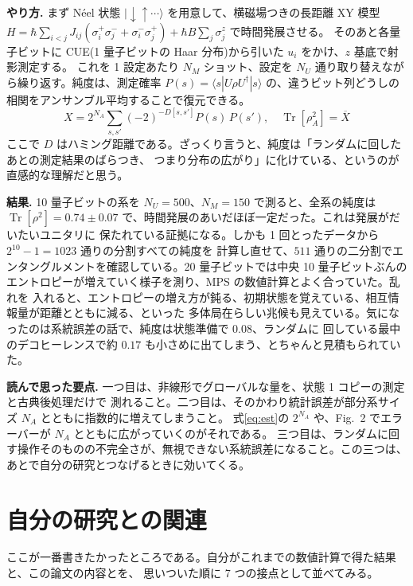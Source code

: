 \documentclass[10pt,a4paper,twocolumn]{ltjsarticle}
\newcommand{\ket}[1]{|#1\rangle}
\newcommand{\bra}[1]{\langle #1|}
\newcommand{\Tr}{\operatorname{Tr}}
\begin{document}
\textbf{やり方.} まず N\'eel 状態 $\ket{\downarrow\uparrow\cdots}$ を用意して、横磁場つきの長距離 XY 模型
$H=\hbar\sum_{i<j}J_{ij}(\sigma_i^+\sigma_j^-+\sigma_i^-\sigma_j^+)+\hbar B\sum_j\sigma_j^z$ で時間発展させる。
そのあと各量子ビットに CUE(1 量子ビットの Haar 分布)から引いた $u_i$ をかけ、$z$ 基底で射影測定する。
これを 1 設定あたり $N_M$ ショット、設定を $N_U$ 通り取り替えながら繰り返す。純度は、測定確率
$P(s)=\bra{s}U\rho U^\dagger\ket{s}$ の、違うビット列どうしの相関をアンサンブル平均することで復元できる。
\begin{equation}
X=2^{N_A}\!\!\sum_{s,s'}(-2)^{-D[s,s']}P(s)\,P(s'),\quad \Tr[\rho_A^2]=\overline{X}
\label{eq:est}
\end{equation}
ここで $D$ はハミング距離である。ざっくり言うと、純度は「ランダムに回したあとの測定結果のばらつき、
つまり分布の広がり」に化けている、というのが直感的な理解だと思う。

\textbf{結果.} 10 量子ビットの系を $N_U{=}500$、$N_M{=}150$ で測ると、全系の純度は
$\Tr[\rho^2]{=}0.74\pm0.07$ で、時間発展のあいだほぼ一定だった。これは発展がだいたいユニタリに
保たれている証拠になる。しかも 1 回とったデータから $2^{10}{-}1{=}1023$ 通りの分割すべての純度を
計算し直せて、$511$ 通りの二分割でエンタングルメントを確認している。20 量子ビットでは中央
10 量子ビットぶんのエントロピーが増えていく様子を測り、MPS の数値計算とよく合っていた。乱れを
入れると、エントロピーの増え方が鈍る、初期状態を覚えている、相互情報量が距離とともに減る、といった
多体局在らしい兆候も見えている。気になったのは系統誤差の話で、純度は状態準備で $0.08$、ランダムに
回している最中のデコヒーレンスで約 $0.17$ も小さめに出てしまう、とちゃんと見積もられていた。

\textbf{読んで思った要点.} 一つ目は、非線形でグローバルな量を、状態 1 コピーの測定と古典後処理だけで
測れること。二つ目は、そのかわり統計誤差が部分系サイズ $N_A$ とともに指数的に増えてしまうこと。
式\eqref{eq:est}の $2^{N_A}$ や、Fig.~2 でエラーバーが $N_A$ とともに広がっていくのがそれである\cite{toolbox_pra}。
三つ目は、ランダムに回す操作そのものの不完全さが、無視できない系統誤差になること。この三つは、
あとで自分の研究とつなげるときに効いてくる。

\section{自分の研究との関連}
ここが一番書きたかったところである。自分がこれまでの数値計算で得た結果と、この論文の内容とを、
思いついた順に 7 つの接点として並べてみる。
\end{document}
